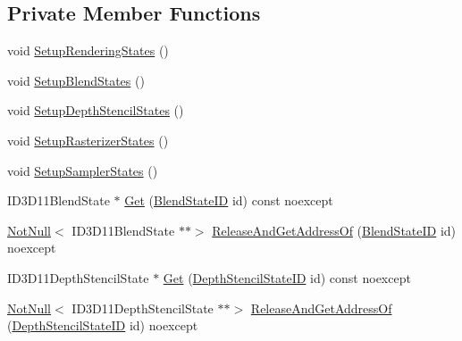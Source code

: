 \subsection*{Private Member Functions}
\begin{DoxyCompactItemize}
\item 
void \mbox{\hyperlink{classmage_1_1rendering_1_1_state_manager_ac2da3d4e04b0ef43e286e4661bca8deb}{Setup\+Rendering\+States}} ()
\item 
void \mbox{\hyperlink{classmage_1_1rendering_1_1_state_manager_a358133f8e2d012ddde64083e83650914}{Setup\+Blend\+States}} ()
\item 
void \mbox{\hyperlink{classmage_1_1rendering_1_1_state_manager_ae77e458a375e8cb2540eeb0230cb047b}{Setup\+Depth\+Stencil\+States}} ()
\item 
void \mbox{\hyperlink{classmage_1_1rendering_1_1_state_manager_a6cee7878db58409e6527d84de1bec5c8}{Setup\+Rasterizer\+States}} ()
\item 
void \mbox{\hyperlink{classmage_1_1rendering_1_1_state_manager_abb74b460f834a402f9ab7527afa64f64}{Setup\+Sampler\+States}} ()
\item 
I\+D3\+D11\+Blend\+State $\ast$ \mbox{\hyperlink{classmage_1_1rendering_1_1_state_manager_a608d62c6a160a50023ad814c9a46874f}{Get}} (\mbox{\hyperlink{namespacemage_1_1rendering_abdf11cdb816b9208aec6c3a81f7564ab}{Blend\+State\+ID}} id) const noexcept
\item 
\mbox{\hyperlink{namespacemage_a8769f9d670d6b585ea306cb1062af94b}{Not\+Null}}$<$ I\+D3\+D11\+Blend\+State $\ast$$\ast$$>$ \mbox{\hyperlink{classmage_1_1rendering_1_1_state_manager_a291dd54e28dc899193583537ab14e4f7}{Release\+And\+Get\+Address\+Of}} (\mbox{\hyperlink{namespacemage_1_1rendering_abdf11cdb816b9208aec6c3a81f7564ab}{Blend\+State\+ID}} id) noexcept
\item 
I\+D3\+D11\+Depth\+Stencil\+State $\ast$ \mbox{\hyperlink{classmage_1_1rendering_1_1_state_manager_aea70c45d9801859582f96b07427a513b}{Get}} (\mbox{\hyperlink{namespacemage_1_1rendering_ace195e7a068336e477080fce30f1329e}{Depth\+Stencil\+State\+ID}} id) const noexcept
\item 
\mbox{\hyperlink{namespacemage_a8769f9d670d6b585ea306cb1062af94b}{Not\+Null}}$<$ I\+D3\+D11\+Depth\+Stencil\+State $\ast$$\ast$$>$ \mbox{\hyperlink{classmage_1_1rendering_1_1_state_manager_a2f9f0bb0f96faa66efe4dfdf0077d868}{Release\+And\+Get\+Address\+Of}} (\mbox{\hyperlink{namespacemage_1_1rendering_ace195e7a068336e477080fce30f1329e}{Depth\+Stencil\+State\+ID}} id) noexcept
\item 

\end{DoxyCompactItemize}
